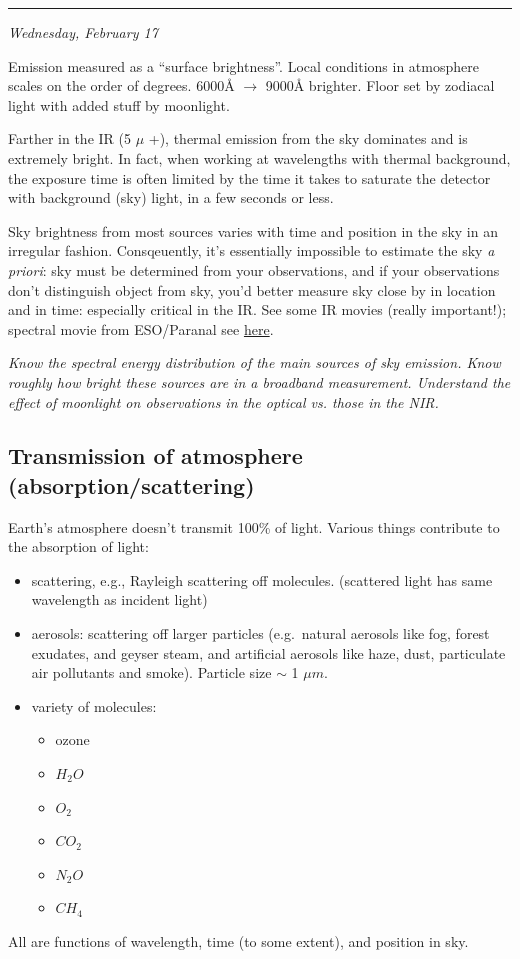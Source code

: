 \documentclass[12pt]{article}
\newcommand{\mynotes}[1]{\textcolor{myBlue}{#1}}
\newcommand{\test}[1]{%
    \begin{center}
        {\parbox{0.9\textwidth}{\textit{\small#1}}}
    \end{center}}
\newcommand{\mydate}[1]{
    \begin{flushright}
        \rule{\textwidth}{0.4pt} %
        \footnotesize\hfill\textit{#1}
    \end{flushright}}
\begin{document}
\mydate{Wednesday, February 17}
\mynotes{Emission measured as a ``surface brightness''.
Local conditions in atmosphere scales on the order of degrees.
6000\AA{} $\rightarrow$ 9000\AA{} brighter. Floor set by zodiacal
light with added stuff by moonlight.}

Farther in the IR (5 $\mu$ +), thermal emission from the sky dominates
and is extremely bright. In fact, when working at wavelengths with thermal
background, the exposure time is often limited by the time it takes to
saturate the detector with background (sky) light, in a few seconds or less.

Sky brightness from most sources varies with time and position in the sky in an
irregular fashion. Consqeuently, it's essentially impossible to estimate the
sky \emph{a priori}: sky must be determined from your observations, and if your
observations don't distinguish object from sky, you'd better measure sky close
by in location and in time: especially critical in the IR\@. See some %
{IR movies} (really important!); %
{spectral movie from ESO/Paranal} see \href{https://www.astro.uni-bonn.de/theli/gui/aboutbackground.html}
{here}.

\test{Know the spectral energy distribution of the main sources of sky emission.
Know roughly how bright these sources are in a broadband measurement.
Understand the effect of moonlight on observations in the optical vs. those in
the NIR.}

\subsection{Transmission of atmosphere (absorption/scattering)}
Earth's atmosphere doesn't transmit 100\% of light. Various things
contribute to the absorption of light:
\begin{itemize}
    \item scattering, e.g., Rayleigh scattering off molecules.
        \mynotes{(scattered light has same wavelength as incident light)}
    \item aerosols: scattering off larger particles (e.g.\ natural
    aerosols like fog, forest exudates, and geyser steam, and
    artificial aerosols like haze, dust, particulate air pollutants
    and smoke). Particle size $\sim$ 1 $\mu m$.
    \item variety of molecules:
    \begin{itemize}
        \item ozone
        \item $H_{2}O$
        \item $O_{2}$
        \item $CO_{2}$
        \item $N_{2}O$
        \item $CH_{4}$
    \end{itemize}
\end{itemize}
All are functions of wavelength, time (to some extent), and position in sky.
\end{document}
